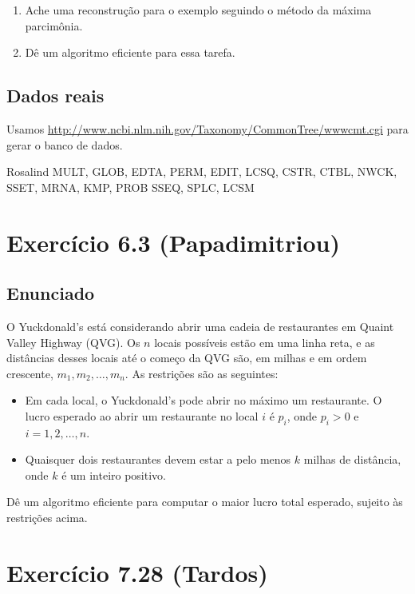\documentclass[11pt]{article}
\begin{document}
\begin{enumerate}
\item Ache uma reconstrução para o exemplo seguindo o método da
máxima parcimônia.
\item Dê um algoritmo eficiente para essa tarefa.
\end{enumerate}


\subsection{Dados reais}
\label{sec-1-2}

Usamos \url{http://www.ncbi.nlm.nih.gov/Taxonomy/CommonTree/wwwcmt.cgi} para gerar o banco de dados.

Rosalind MULT, GLOB, EDTA, PERM, EDIT, LCSQ,
CSTR, CTBL, NWCK, SSET, MRNA, KMP, PROB
SSEQ, SPLC, LCSM


\section{Exercício 6.3 (Papadimitriou)}
\label{sec-2}

\subsection{Enunciado}
\label{sec-2-1}

O Yuckdonald's está considerando abrir uma cadeia de restaurantes em
Quaint Valley Highway (QVG). Os $n$ locais possíveis estão em uma
linha reta, e as distâncias desses locais até o começo da QVG são, em
milhas e em ordem crescente, $m_1, m_2, \ldots, m_n$. As restrições
são as seguintes:

\begin{itemize}
\item Em cada local, o Yuckdonald's pode abrir no máximo um
restaurante. O lucro esperado ao abrir um restaurante no local
$i$ é $p_i$, onde $p_i > 0$ e $i = 1, 2, \ldots, n$.
\item Quaisquer dois restaurantes devem estar a pelo menos $k$
  milhas de distância, onde $k$ é um inteiro positivo.
\end{itemize}

Dê um algoritmo eficiente para computar o maior lucro total
esperado, sujeito às restrições acima.




\section{Exercício 7.28 (Tardos)}
\label{sec-3}
\end{document}
